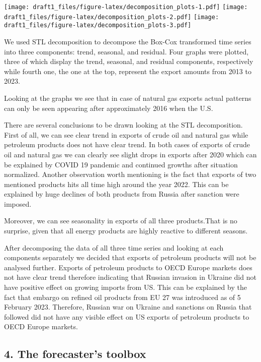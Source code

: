 \documentclass[
]{article}
\begin{document}
\texttt{[image: draft1\_files/figure-latex/decomposition\_plots-1.pdf]}
\texttt{[image: draft1\_files/figure-latex/decomposition\_plots-2.pdf]}
\texttt{[image: draft1\_files/figure-latex/decomposition\_plots-3.pdf]}

We used STL decomposition to decompose the Box-Cox transformed time
series into three components: trend, seasonal, and residual. Four graphs
were plotted, three of which display the trend, seasonal, and residual
components, respectively while fourth one, the one at the top, represent
the export amounts from 2013 to 2023.

Looking at the graphs we see that in case of natural gas exports actual
patterns can only be seen appearing after approximately 2016 when the
U.S.

There are several conclusions to be drawn looking at the STL
decomposition. First of all, we can see clear trend in exports of crude
oil and natural gas while petroleum products does not have clear trend.
In both cases of exports of crude oil and natural gas we can clearly see
slight drops in exports after 2020 which can be explained by COVID 19
pandemic and continued growths after situation normalized. Another
observation worth mentioning is the fact that exports of two mentioned
products hits all time high around the year 2022. This can be explained
by huge declines of both products from Russia after sanction were
imposed.

Moreover, we can see seasonality in exports of all three products.That
is no surprise, given that all energy products are highly reactive to
different seasons.

After decomposing the data of all three time series and looking at each
components separately we decided that exports of petroleum products will
not be analysed further. Exports of petroleum products to OECD Europe
markets does not have clear trend therefore indicating that Russian
invasion in Ukraine did not have positive effect on growing imports from
US. This can be explained by the fact that embargo on refined oil
products from EU 27 was introduced as of 5 February 2023. Therefore,
Russian war on Ukraine and sanctions on Russia that followed did not
have any visible effect on US exports of petroleum products to OECD
Europe markets.

\hypertarget{the-forecasters-toolbox}{%
\subsection{4. The forecaster's toolbox}\label{the-forecasters-toolbox}}
\end{document}
